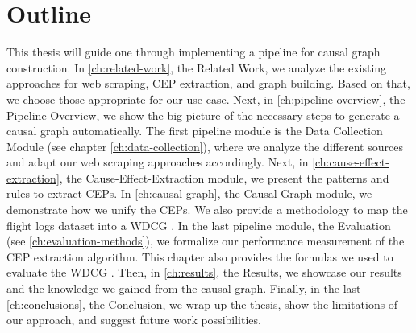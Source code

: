 \section{Outline}\label{sec:outline}
This thesis will guide one through implementing a pipeline for causal graph construction.
In \autoref{ch:related-work}, the Related Work, we analyze the existing approaches for web scraping, \ac{CEP} extraction, and graph building.
Based on that, we choose those appropriate for our use case.
Next, in \autoref{ch:pipeline-overview}, the Pipeline Overview, we show the big picture of the necessary steps to generate a causal graph automatically.
The first pipeline module is the Data Collection Module (see chapter \autoref{ch:data-collection}), where we analyze the different sources and adapt our web scraping approaches accordingly.
Next, in \autoref{ch:cause-effect-extraction}, the Cause-Effect-Extraction module, we present the patterns and rules to extract \ac{CEP}s.
In \autoref{ch:causal-graph}, the Causal Graph module, we demonstrate how we unify the \ac{CEP}s.
We also provide a methodology to map the flight logs dataset into a \ac{WDCG} .
In the last pipeline module, the Evaluation (see \autoref{ch:evaluation-methods}), we formalize our performance measurement of the \ac{CEP} extraction algorithm.
This chapter also provides the formulas we used to evaluate the \ac{WDCG} .
Then, in \autoref{ch:results}, the Results, we showcase our results and the knowledge we gained from the causal graph.
Finally, in the last \autoref{ch:conclusions}, the Conclusion, we wrap up the thesis, show the limitations of our approach, and suggest future work possibilities.
